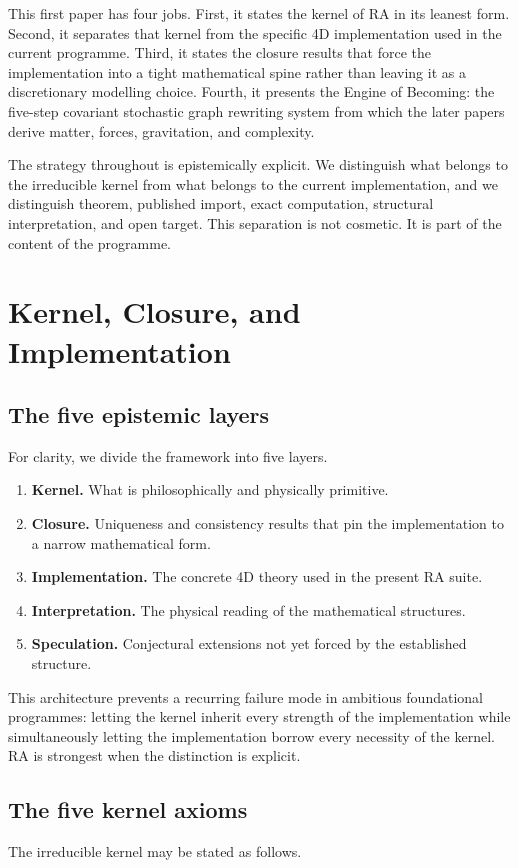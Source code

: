 \documentclass[11pt]{article}
\begin{document}
This first paper has four jobs. First, it states the kernel of RA in its leanest form. Second, it separates that kernel from the specific 4D implementation used in the current programme. Third, it states the closure results that force the implementation into a tight mathematical spine rather than leaving it as a discretionary modelling choice. Fourth, it presents the Engine of Becoming: the five-step covariant stochastic graph rewriting system from which the later papers derive matter, forces, gravitation, and complexity.

The strategy throughout is epistemically explicit. We distinguish what belongs to the irreducible kernel from what belongs to the current implementation, and we distinguish theorem, published import, exact computation, structural interpretation, and open target. This separation is not cosmetic. It is part of the content of the programme.

\section{Kernel, Closure, and Implementation}
\subsection{The five epistemic layers}
For clarity, we divide the framework into five layers.
\begin{enumerate}[label=\arabic*.]
    \item \textbf{Kernel.} What is philosophically and physically primitive.
    \item \textbf{Closure.} Uniqueness and consistency results that pin the implementation to a narrow mathematical form.
    \item \textbf{Implementation.} The concrete 4D theory used in the present RA suite.
    \item \textbf{Interpretation.} The physical reading of the mathematical structures.
    \item \textbf{Speculation.} Conjectural extensions not yet forced by the established structure.
\end{enumerate}

This architecture prevents a recurring failure mode in ambitious foundational programmes: letting the kernel inherit every strength of the implementation while simultaneously letting the implementation borrow every necessity of the kernel. RA is strongest when the distinction is explicit.

\subsection{The five kernel axioms}
The irreducible kernel may be stated as follows.
\end{document}
